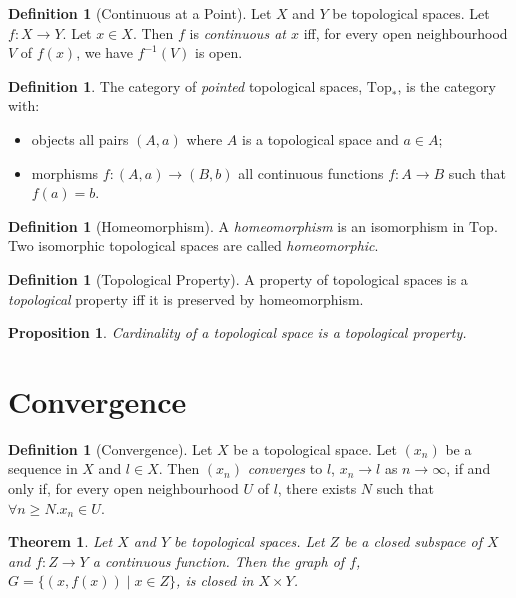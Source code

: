 \documentclass{book}
\newtheorem{prop}[ax]{Proposition}
\newtheorem{thm}[ax]{Theorem}
\theoremstyle{definition}
\newtheorem{df}[ax]{Definition}
\begin{document}
\begin{df}[Continuous at a Point]
Let $X$ and $Y$ be topological spaces. Let $f : X \rightarrow Y$. Let $x \in X$. Then $f$ is \emph{continuous at $x$} iff, for every open neighbourhood $V$ of $f(x)$, we have $f^{-1}(V)$ is open.
\end{df}

\begin{df}
The category of \emph{pointed} topological spaces, $\mathrm{Top}_*$, is the category with:
\begin{itemize}
\item objects all pairs $(A,a)$ where $A$ is a topological space and $a \in A$;
\item morphisms $f : (A,a) \rightarrow (B,b)$ all continuous functions $f : A \rightarrow B$ such that $f(a) = b$.
\end{itemize}
\end{df}

\begin{df}[Homeomorphism]
A \emph{homeomorphism} is an isomorphism in $\mathrm{Top}$. Two isomorphic topological spaces are called \emph{homeomorphic}.
\end{df}

\begin{df}[Topological Property]
A property of topological spaces is a \emph{topological} property iff it is preserved by homeomorphism.
\end{df}

\begin{prop}
Cardinality of a topological space is a topological property.
\end{prop}

\section{Convergence}

\begin{df}[Convergence]
Let $X$ be a topological space. Let $(x_n)$ be a sequence in $X$ and $l \in X$. Then $(x_n)$ \emph{converges} to $l$, $x_n \rightarrow l$ as $n \rightarrow \infty$, if and only if, for every open neighbourhood $U$ of $l$, there exists $N$ such that $\forall n \geq N. x_n \in U$.
\end{df}

\begin{thm}
Let $X$ and $Y$ be topological spaces. Let $Z$ be a closed subspace of $X$ and $f : Z \rightarrow Y$ a continuous function. Then the graph of $f$, $G = \{ (x,f(x)) \mid x \in Z \}$, is closed in $X \times Y$.
\end{thm}
\end{document}
